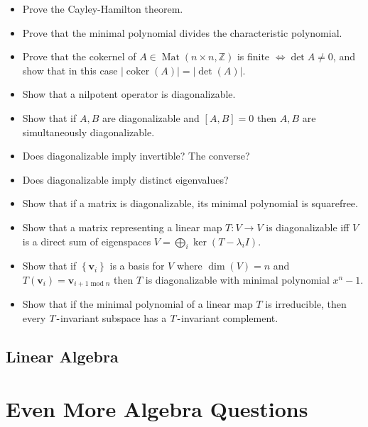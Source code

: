 \begin{itemize}
\tightlist
\item
  Prove the Cayley-Hamilton theorem.
\item
  Prove that the minimal polynomial divides the characteristic
  polynomial.
\item
  Prove that the cokernel of
  \(A\in \operatorname{Mat}(n\times n, {\mathbb{Z}})\) is finite
  \(\iff \operatorname{det}A \neq 0\), and show that in this case
  \({\left\lvert {\operatorname{coker}(A)} \right\rvert} = {\left\lvert {\operatorname{det}(A)} \right\rvert}\).
\item
  Show that a nilpotent operator is diagonalizable.
\item
  Show that if \(A,B\) are diagonalizable and \([A, B] = 0\) then
  \(A,B\) are simultaneously diagonalizable.
\item
  Does diagonalizable imply invertible? The converse?
\item
  Does diagonalizable imply distinct eigenvalues?
\item
  Show that if a matrix is diagonalizable, its minimal polynomial is
  squarefree.
\item
  Show that a matrix representing a linear map \(T:V\to V\) is
  diagonalizable iff \(V\) is a direct sum of eigenspaces
  \(V = \bigoplus_i \ker(T -\lambda_i I)\).
\item
  Show that if \(\left\{{\mathbf{v}_i}\right\}\) is a basis for \(V\)
  where \(\dim(V) = n\) and
  \(T(\mathbf{v}_i) = \mathbf{v}_{i+1 \operatorname{mod}n}\) then \(T\)
  is diagonalizable with minimal polynomial \(x^n-1\).
\item
  Show that if the minimal polynomial of a linear map \(T\) is
  irreducible, then every \(T{\hbox{-}}\)invariant subspace has a
  \(T{\hbox{-}}\)invariant complement.
\end{itemize}

\hypertarget{linear-algebra-1}{%
\subsection{Linear Algebra}\label{linear-algebra-1}}


\hypertarget{even-more-algebra-questions}{%
\section{Even More Algebra
Questions}\label{even-more-algebra-questions}}

